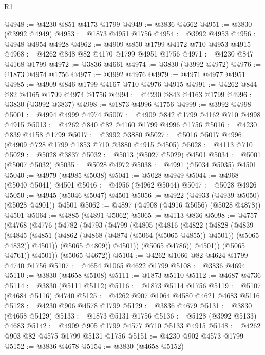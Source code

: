 \begin{lexlean}{R1}
\begin{coremodule}
@4948 := @4230 @851 @4173 @1799
@4949 := @3836 @4662
@4951 := @3830 (@3992 @4949)
@4953 := @1873 @4951 @1756
@4954 := @3992 @4953
@4956 := @4948 @4954 @4928
@4962 := @4909 @850 @1799 @4172 @710 @4953 @4915
@4968 := @4262 @848 @82 @4170 @1799 @4951 @1756
@4971 := @4230 @847 @4168 @1799
@4972 := @3836 @4661
@4974 := @3830 (@3992 @4972)
@4976 := @1873 @4974 @1756
@4977 := @3992 @4976
@4979 := @4971 @4977 @4951
@4985 := @4909 @846 @1799 @4167 @710 @4976 @4915
@4991 := @4262 @844 @82 @4165 @1799 @4974 @1756
@4994 := @4230 @843 @4163 @1799
@4996 := @3830 (@3992 @3837)
@4998 := @1873 @4996 @1756
@4999 := @3992 @4998
@5001 := @4994 @4999 @4974
@5007 := @4909 @842 @1799 @4162 @710 @4998 @4915
@5013 := @4262 @840 @82 @4160 @1799 @4996 @1756
@5016 := @4230 @839 @4158 @1799
@5017 := @3992 @3880
@5027 := @5016 @5017 @4996 (@4909 @728 @1799 @1853 @710 @3880 @4915 @4505)
@5028 := @4113 @710
@5029 := @5028 @3837
@5032 := @5013 (@5027 @5029) @4501
@5034 := @5001 (@5007 @5032)
@5035 := @5028 @4972
@5038 := @4991 (@5034 @5035) @4501
@5040 := @4979 (@4985 @5038)
@5041 := @5028 @4949
@5044 := @4968 (@5040 @5041) @4501
@5046 := @4956 (@4962 @5044)
@5047 := @5028 @4926
@5050 := @4945 (@5046 @5047) @4501
@5056 := @4922 (@4933 (@4939 @5050) (@5028 @4901)) @4501
@5062 := @4897 (@4908 (@4916 @5056) (@5028 @4878)) @4501
@5064 := @4885 (@4891 @5062)
@5065 := @4113 @836
@5098 := @4757
    (@4768
      (@4776
        (@4782
          (@4793
            (@4799
              (@4805
                (@4816
                  (@4822
                    (@4828
                      (@4839
                        (@4845
                          (@4851
                            (@4862 (@4868 (@4874 (@5064 (@5065 @4855)) @4501)) (@5065 @4832))
                            @4501))
                        (@5065 @4809))
                      @4501))
                  (@5065 @4786))
                @4501))
            (@5065 @4761))
          @4501))
      (@5065 @4672))
@5104 := @4262 @1066 @82 @4624 @1799 @4740 @1756
@5107 := @4654 @1065 @4622 @1799
@5108 := @3836 @4694
@5110 := @3830 (@4658 @5108)
@5111 := @1873 @5110
@5112 := @4687 @4736
@5114 := @3830 (@5111 @5112)
@5116 := @1873 @5114 @1756
@5119 := @5107 (@4684 @5116) @4740
@5125 := @4262 @907 @1064 @4580 @4621 @4683 @5116
@5128 := @4230 @906 @4578 @1799
@5129 := @3836 @4679
@5131 := @3830 (@4658 @5129)
@5133 := @1873 @5131 @1756
@5136 := @5128 (@3992 @5133) @4683
@5142 := @4909 @905 @1799 @4577 @710 @5133 @4915
@5148 := @4262 @903 @82 @4575 @1799 @5131 @1756
@5151 := @4230 @902 @4573 @1799
@5152 := @3836 @4678
@5154 := @3830 (@4658 @5152)

\end{coremodule}
\end{lexlean}
